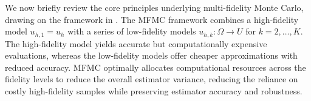 

We now briefly review the core principles underlying multi-fidelity Monte Carlo, drawing on the framework in \cite{PeWiGu:2016}.  The MFMC framework combines a high-fidelity model $u_{h,1} = u_h$ with a series of low-fidelity models $u_{h,k}: \Omega \rightarrow U$ for $k=2,\ldots,K$.  The high-fidelity model yields accurate but computationally expensive evaluations, whereas the low-fidelity models offer cheaper approximations with reduced accuracy. MFMC optimally allocates computational resources across the fidelity levels to reduce the overall estimator variance, reducing the reliance on costly high-fidelity samples while preserving estimator accuracy and robustness.



